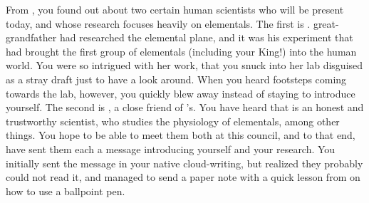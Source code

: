 \documentclass[char]{elementals}
\begin{document}
From \cDiplomat{}, you found out about two certain human scientists who will be present today, and whose research focuses heavily on elementals.  The first is \cGD{\intro}.  \cGD{\Their} great-grandfather had researched the elemental plane, and it was his experiment that had brought the first group of elementals (including your King!) into the human world.  You were so intrigued with her work, that you snuck into her lab disguised as a stray draft just to have a look around.  When you heard footsteps coming towards the lab, however, you quickly blew away instead of staying to introduce yourself.  The second is \cScientist{\intro}, a close friend of \cDiplomat{}'s.  You have heard that \cScientist{} is an honest and trustworthy scientist, who studies the physiology of elementals, among other things.  You hope to be able to meet them both at this council, and to that end, have sent them each a message introducing yourself and your research.  You initially sent the message in your native cloud-writing, but realized they probably could not read it, and managed to send a paper note with a quick lesson from \cDiplomat{} on how to use a ballpoint pen.
\end{document}
